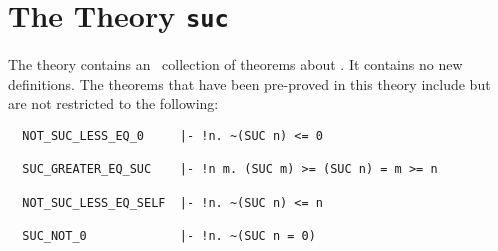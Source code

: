 \section{The Theory {\tt suc}}

The theory  contains an
\adhoc\ collection of 
theorems about . It contains no new definitions.
The theorems that have been pre-proved in this theory include but are not
restricted to the following:
\begin{hol}
\begin{verbatim}
  NOT_SUC_LESS_EQ_0     |- !n. ~(SUC n) <= 0

  SUC_GREATER_EQ_SUC    |- !n m. (SUC m) >= (SUC n) = m >= n

  NOT_SUC_LESS_EQ_SELF  |- !n. ~(SUC n) <= n

  SUC_NOT_0             |- !n. ~(SUC n = 0)
\end{verbatim}\end{hol}
